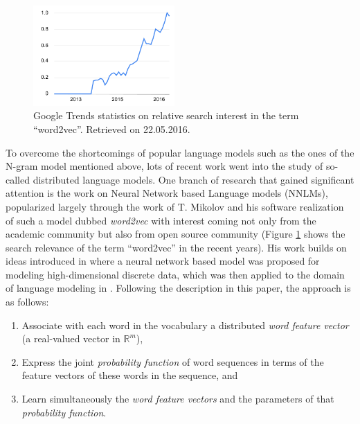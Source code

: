 \begin{figure}
  \begin{center}
    \includegraphics[width=0.48\textwidth]{img/word2vec-google-trends.pdf}
  \end{center}
  \caption{Google Trends statistics on relative search interest in the term ``word2vec''. Retrieved on 22.05.2016.}
  \label{fig:word2vec-google-trends}
\end{figure}

To overcome the shortcomings of popular language models such as the ones of the N-gram model mentioned above, lots of recent work went into the study of so-called distributed language models. One branch of research that gained significant attention is the work on Neural Network based Language models (NNLMs), popularized largely through the work of T. Mikolov and his software realization of such a model dubbed \emph{word2vec} with interest coming not only from the academic community but also from open source community (Figure \ref{fig:word2vec-google-trends} shows the search relevance of the term ``word2vec'' in the recent years). His work builds on ideas introduced in \cite{Bengio:2000aa} where a neural network based model was proposed for modeling high-dimensional discrete data, which was then applied to the domain of language modeling in \cite{bengio2003neural}. Following the description in this paper, the approach is as follows:

\begin{enumerate}
  \item Associate with each word in the vocabulary a distributed \emph{word feature vector} (a real-valued vector in $\mathbb{R}^m$),
  \item Express the joint \emph{probability function} of word sequences in terms of the feature vectors of these words in the sequence, and
  \item Learn simultaneously the \emph{word feature vectors} and the parameters of that \emph{probability function}.
\end{enumerate}

